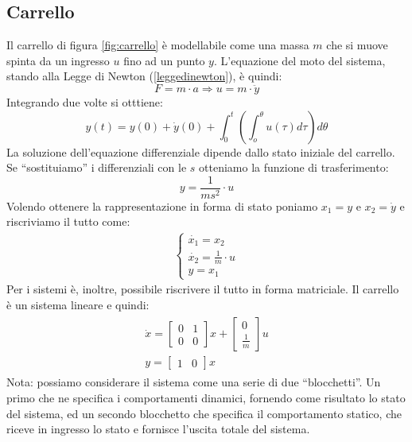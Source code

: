 \documentclass[a4paper]{report}
\begin{document}
\subsection{Carrello}\label{carrello}
Il carrello di figura \ref{fig:carrello} \`e modellabile come una massa $m$ che si muove spinta da
un ingresso $u$ fino ad un punto $y$. L'equazione del moto del
sistema, stando alla Legge di Newton (\ref{leggedinewton}), 
\`e quindi:
\begin{equation}
  F = m \cdot a \Rightarrow u = m \cdot \ddot{y}
\end{equation}
Integrando due volte si otttiene:
$$y(t) = y(0) + \dot{y}(0) + \int_0^t \left ( \int_o^{\theta} u(\tau)d\tau
\right ) d \theta$$
La soluzione dell'equazione differenziale dipende dallo stato iniziale
del carrello. Se ``sostituiamo'' i differenziali con le $s$ otteniamo
la funzione di trasferimento:
$$y = \frac{1}{ms^2} \cdot u$$
Volendo ottenere la rappresentazione in forma di stato poniamo $x_1 =
y$ e $x_2 = \dot{y}$ e riscriviamo il tutto come:
\begin{eqnarray*}
  \left\{ \begin{array}{l}
    \dot{x_1} = x_2\\
    \dot{x_2} = \frac{1}{m} \cdot u\\
    y = x_1
    \end{array}\right .
\end{eqnarray*}
Per i sistemi \`e, inoltre, possibile riscrivere il tutto in forma
matriciale. Il carrello \`e un sistema lineare e quindi:
\begin{eqnarray*}
  \begin{array}{l}
    \dot{x} = 
    \begin{bmatrix}
      0 & 1\\
      0 & 0
    \end{bmatrix}
    x + 
    \begin{bmatrix}
      0\\
      \frac{1}{m}
    \end{bmatrix}u
    \\
    y = \begin{bmatrix}1 & 0 \end{bmatrix}x
    \end{array}
\end{eqnarray*}
Nota: possiamo considerare il sistema come una serie di due
``blocchetti''. Un primo che ne specifica i comportamenti dinamici,
fornendo come risultato lo stato del sistema, ed un secondo blocchetto
che specifica il comportamento statico, che riceve in ingresso lo
stato e fornisce l'uscita totale del sistema.
\end{document}
